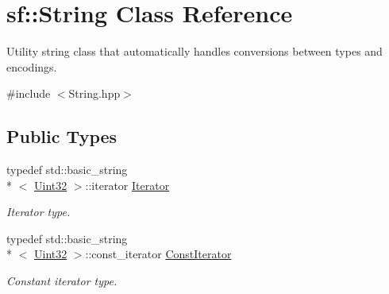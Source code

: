 \hypertarget{classsf_1_1_string}{\section{sf\-:\-:String Class Reference}
\label{classsf_1_1_string}
}


Utility string class that automatically handles conversions between types and encodings.  




{\ttfamily \#include $<$String.\-hpp$>$}

\subsection*{Public Types}
\begin{DoxyCompactItemize}
\item 
typedef std\-::basic\-\_\-string\\*
$<$ \hyperlink{namespacesf_aa746fb1ddef4410bddf198ebb27e727c}{Uint32} $>$\-::iterator \hyperlink{classsf_1_1_string_ac90f2b7b28f703020f8d027e98806235}{Iterator}
\begin{DoxyCompactList}\small\item\em Iterator type. \end{DoxyCompactList}\item 
typedef std\-::basic\-\_\-string\\*
$<$ \hyperlink{namespacesf_aa746fb1ddef4410bddf198ebb27e727c}{Uint32} $>$\-::const\-\_\-iterator \hyperlink{classsf_1_1_string_a8e18efc2e8464f6eb82818902d527efa}{Const\-Iterator}
\begin{DoxyCompactList}\small\item\em Constant iterator type. \end{DoxyCompactList}\end{DoxyCompactItemize}
